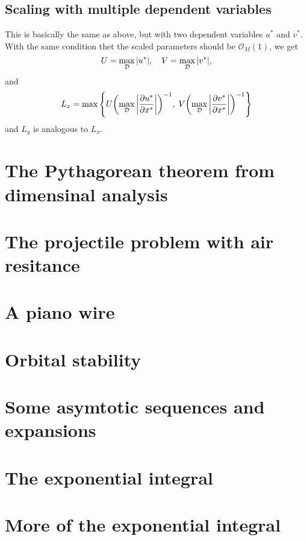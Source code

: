 \documentclass[11pt,letter, swedish, english
]{article}
\begin{document}
\subsection{Scaling with multiple dependent variables}
This is basically the same as above, but with two dependent variables
$u^*$ and $v^*$. With the same condition thet the scaled parameters
should be $\mathcal{O}_M(1)$, we get
\begin{equation}
U=\max_\mathcal{D}\abs{u^*} \qcomma
V=\max_\mathcal{D}\abs{v^*},
\end{equation}
and 
\begin{equation}
L_x=\max\qty{
U\qty(\max_\mathcal{D}\abs{\pdv{u^*}{x^*}})^{-1},\;
V\qty(\max_\mathcal{D}\abs{\pdv{v^*}{x^*}})^{-1}
}
\end{equation}
and $L_y$ is analogous to $L_x$.





\renewcommand{\thesubsection}{\arabic{section} (\alph{subsection})}
\renewcommand{\thesubsubsection}{\arabic{section} (\alph{subsection},\,\roman{subsubsection})}

\section{The Pythagorean theorem from dimensinal analysis}


\section{The projectile problem with air resitance}


\section{A piano wire}


\section{Orbital stability }


\section{Some asymtotic sequences and expansions}


\section{The exponential integral}


\section{More of the exponential integral}
\end{document}
